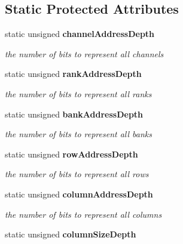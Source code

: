 \subsection*{Static Protected Attributes}
\begin{DoxyCompactItemize}
\item 
static unsigned {\bf channelAddressDepth}\label{class_d_r_a_msim_i_i_1_1_address_a11349fa1c0555dc4059318d4c93e7f43}

\begin{DoxyCompactList}\small\item\em the number of bits to represent all channels \item\end{DoxyCompactList}\item 
static unsigned {\bf rankAddressDepth}\label{class_d_r_a_msim_i_i_1_1_address_a5b8470c0cb8af315691c90d2331dbc44}

\begin{DoxyCompactList}\small\item\em the number of bits to represent all ranks \item\end{DoxyCompactList}\item 
static unsigned {\bf bankAddressDepth}\label{class_d_r_a_msim_i_i_1_1_address_ac99876d659041711c5918c81e4446d7a}

\begin{DoxyCompactList}\small\item\em the number of bits to represent all banks \item\end{DoxyCompactList}\item 
static unsigned {\bf rowAddressDepth}\label{class_d_r_a_msim_i_i_1_1_address_a68909db0f9958d932a12b74ff98eb3cc}

\begin{DoxyCompactList}\small\item\em the number of bits to represent all rows \item\end{DoxyCompactList}\item 
static unsigned {\bf columnAddressDepth}\label{class_d_r_a_msim_i_i_1_1_address_aa3bb010911eee8fba8b16dd40344b4c1}

\begin{DoxyCompactList}\small\item\em the number of bits to represent all columns \item\end{DoxyCompactList}\item 
static unsigned {\bf columnSizeDepth}\label{class_d_r_a_msim_i_i_1_1_address_a6772f2ae61044ec8c7d554ff80b0463a}


\end{DoxyCompactItemize}
